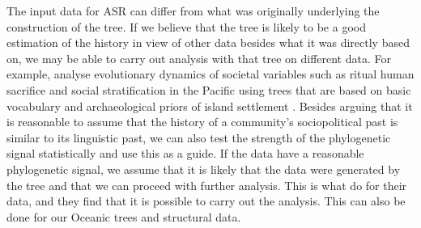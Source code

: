 \documentclass[12pt,letterpaper]{article}
\begin{document}
The input data for ASR can differ from what was originally underlying the construction of the tree. If we believe that the tree is likely to be a good estimation of the history in view of other data besides what it was directly based on, we may be able to carry out analysis with that tree on different data. For example, \citet{watts2016ritual} analyse evolutionary dynamics of societal variables such as ritual human sacrifice and social stratification in the Pacific using trees that are based on basic vocabulary and archaeological priors of island settlement \citep{grayetal_2009}. Besides arguing that it is reasonable to assume that the history of a community's sociopolitical past is similar to its linguistic past, we can also test the strength of the phylogenetic signal statistically and use this as a guide. If the data have a reasonable phylogenetic signal, we assume that it is likely that the data were generated by the tree and that we can proceed with further analysis. This is what \citet{watts2016ritual} do for their data, and they find that it is possible to carry out the analysis. This can also be done for our Oceanic trees and structural data.
\end{document}
